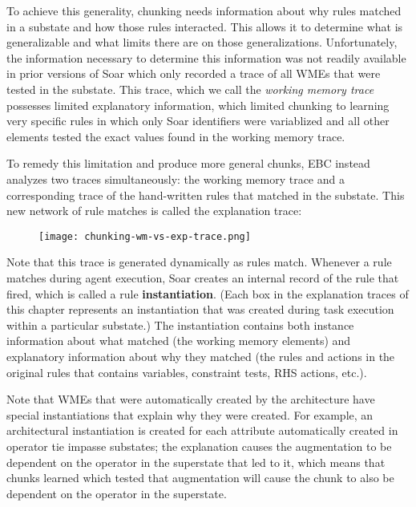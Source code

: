 To achieve this generality, chunking needs information about why rules matched in a substate and how those rules interacted.  This allows it to determine what is generalizable and what limits there are on those generalizations. Unfortunately, the information necessary to determine this information was not readily available in prior versions of Soar which only recorded a trace of all WMEs that were tested in the substate.  This trace, which we call the \textit{working memory trace} possesses limited explanatory information, which limited chunking to learning very specific rules in which only Soar identifiers were variablized and all other elements tested the exact values found in the working memory trace.  

To remedy this limitation and produce more general chunks, EBC instead analyzes two traces simultaneously:  the working memory trace and a corresponding trace of the hand-written rules that matched in the substate.  This new network of rule matches is called the explanation trace:

\vspace{18pt}
\begin{figure}[!h]
	\centering
	\texttt{[image: chunking-wm-vs-exp-trace.png]}
	\label{fig:chunking-wm-vs-exp}
\end{figure}
\vspace{6pt}

Note that this trace is generated dynamically as rules match.  Whenever a rule matches during agent execution, Soar creates an internal record of the rule that fired, which is called a rule \textbf{instantiation}.  (Each box in the explanation traces of this chapter represents an instantiation that was created during task execution within a particular substate.) The instantiation contains both instance information about what matched (the working memory elements) and explanatory information about why they matched (the rules and actions in the original rules that contains variables, constraint tests, RHS actions, etc.).  

Note that WMEs that were automatically created by the architecture have special instantiations that explain why they were created.  For example, an architectural instantiation is created for each  attribute automatically created in operator tie impasse substates; the explanation causes the  augmentation to be dependent on the operator in the superstate that led to it, which means that chunks learned which tested that  augmentation will cause the chunk to also be dependent on the operator in the superstate.  

